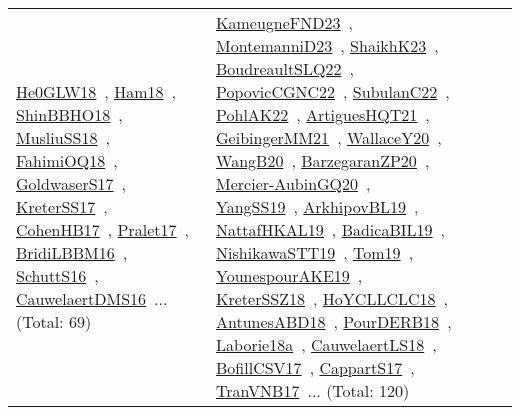 {\begin{longtable}{lp{3cm}>{\raggedright\arraybackslash}p{6cm}>{\raggedright\arraybackslash}p{6cm}>{\raggedright\arraybackslash}p{8cm}}
\href{works/He0GLW18.pdf}{He0GLW18}~\cite{He0GLW18}, \href{works/Ham18.pdf}{Ham18}~\cite{Ham18}, \href{works/ShinBBHO18.pdf}{ShinBBHO18}~\cite{ShinBBHO18}, \href{works/MusliuSS18.pdf}{MusliuSS18}~\cite{MusliuSS18}, \href{works/FahimiOQ18.pdf}{FahimiOQ18}~\cite{FahimiOQ18}, \href{works/GoldwaserS17.pdf}{GoldwaserS17}~\cite{GoldwaserS17}, \href{works/KreterSS17.pdf}{KreterSS17}~\cite{KreterSS17}, \href{works/CohenHB17.pdf}{CohenHB17}~\cite{CohenHB17}, \href{works/Pralet17.pdf}{Pralet17}~\cite{Pralet17}, \href{works/BridiLBBM16.pdf}{BridiLBBM16}~\cite{BridiLBBM16}, \href{works/SchuttS16.pdf}{SchuttS16}~\cite{SchuttS16}, \href{works/CauwelaertDMS16.pdf}{CauwelaertDMS16}~\cite{CauwelaertDMS16}... (Total: 69) & \href{works/KameugneFND23.pdf}{KameugneFND23}~\cite{KameugneFND23}, \href{works/MontemanniD23.pdf}{MontemanniD23}~\cite{MontemanniD23}, \href{works/ShaikhK23.pdf}{ShaikhK23}~\cite{ShaikhK23}, \href{works/BoudreaultSLQ22.pdf}{BoudreaultSLQ22}~\cite{BoudreaultSLQ22}, \href{works/PopovicCGNC22.pdf}{PopovicCGNC22}~\cite{PopovicCGNC22}, \href{works/SubulanC22.pdf}{SubulanC22}~\cite{SubulanC22}, \href{works/PohlAK22.pdf}{PohlAK22}~\cite{PohlAK22}, \href{works/ArtiguesHQT21.pdf}{ArtiguesHQT21}~\cite{ArtiguesHQT21}, \href{works/GeibingerMM21.pdf}{GeibingerMM21}~\cite{GeibingerMM21}, \href{works/WallaceY20.pdf}{WallaceY20}~\cite{WallaceY20}, \href{works/WangB20.pdf}{WangB20}~\cite{WangB20}, \href{works/BarzegaranZP20.pdf}{BarzegaranZP20}~\cite{BarzegaranZP20}, \href{works/Mercier-AubinGQ20.pdf}{Mercier-AubinGQ20}~\cite{Mercier-AubinGQ20}, \href{works/YangSS19.pdf}{YangSS19}~\cite{YangSS19}, \href{works/ArkhipovBL19.pdf}{ArkhipovBL19}~\cite{ArkhipovBL19}, \href{works/NattafHKAL19.pdf}{NattafHKAL19}~\cite{NattafHKAL19}, \href{works/BadicaBIL19.pdf}{BadicaBIL19}~\cite{BadicaBIL19}, \href{works/NishikawaSTT19.pdf}{NishikawaSTT19}~\cite{NishikawaSTT19}, \href{works/Tom19.pdf}{Tom19}~\cite{Tom19}, \href{works/YounespourAKE19.pdf}{YounespourAKE19}~\cite{YounespourAKE19}, \href{works/KreterSSZ18.pdf}{KreterSSZ18}~\cite{KreterSSZ18}, \href{works/HoYCLLCLC18.pdf}{HoYCLLCLC18}~\cite{HoYCLLCLC18}, \href{works/AntunesABD18.pdf}{AntunesABD18}~\cite{AntunesABD18}, \href{works/PourDERB18.pdf}{PourDERB18}~\cite{PourDERB18}, \href{works/Laborie18a.pdf}{Laborie18a}~\cite{Laborie18a}, \href{works/CauwelaertLS18.pdf}{CauwelaertLS18}~\cite{CauwelaertLS18}, \href{works/BofillCSV17.pdf}{BofillCSV17}~\cite{BofillCSV17}, \href{works/CappartS17.pdf}{CappartS17}~\cite{CappartS17}, \href{works/TranVNB17.pdf}{TranVNB17}~\cite{TranVNB17}... (Total: 120)\\

\end{longtable}}

